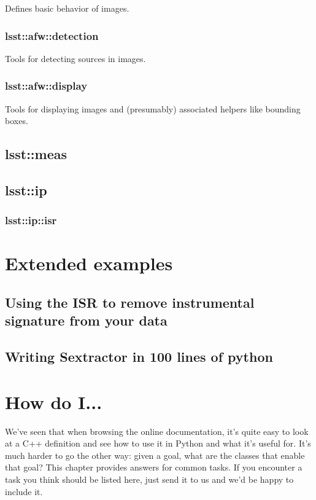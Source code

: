 \documentclass{book}
\begin{document}
Defines basic behavior of images.

\subsection{lsst::afw::detection}

Tools for detecting sources in images.

\subsection{lsst::afw::display}

Tools for displaying images and (presumably) associated helpers like
bounding boxes.

\section{lsst::meas}

\section{lsst::ip}

\subsection{lsst::ip::isr}




\chapter{Extended examples}

\section{Using the ISR to remove instrumental signature from your data}

\section{Writing Sextractor in 100 lines of python}
 
\chapter{How do I...}

We've seen that when browsing the online documentation, it's quite
easy to look at a C++ definition and see how to use it in Python and
what it's useful for.  It's much harder to go the other way: given a
goal, what are the classes that enable that goal?  This chapter
provides answers for common tasks. If you encounter a task you think
should be listed here, just send it to us and we'd be happy to include
it.
\end{document}

